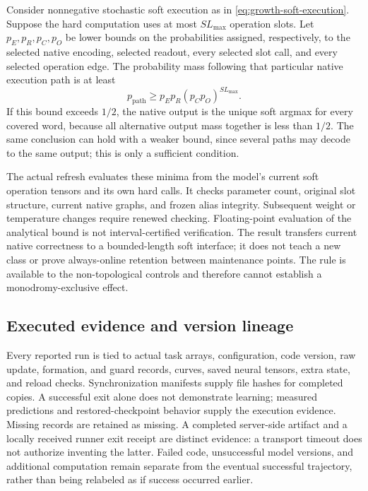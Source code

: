Consider nonnegative stochastic soft execution as in
\eqref{eq:growth-soft-execution}. Suppose the hard computation uses at most
$S L_{\max}$ operation slots. Let $p_E,p_R,p_C,p_O$ be lower bounds on the
probabilities assigned, respectively, to the selected native encoding,
selected readout, every selected slot call, and every selected operation edge.
The probability mass following that particular native execution path is at
least
\begin{equation}
 p_{\mathrm{path}}\geq p_Ep_R(p_Cp_O)^{S L_{\max}}.
 \label{eq:soft-native-path-bound}
\end{equation}
If this bound exceeds $1/2$, the native output is the unique soft argmax for
every covered word, because all alternative output mass together is less than
$1/2$. The same conclusion can hold with a weaker bound, since several paths
may decode to the same output; this is only a sufficient condition.

The actual refresh evaluates these minima from the model's current soft
operation tensors and its own hard calls. It checks parameter count, original
slot structure, current native graphs, and frozen alias integrity. Subsequent
weight or temperature changes require renewed checking. Floating-point
evaluation of the analytical bound is not interval-certified verification.
The result transfers current native correctness to a bounded-length soft
interface; it does not teach a new class or prove always-online retention
between maintenance points. The rule is available to the non-topological
controls and therefore cannot establish a monodromy-exclusive effect.

\subsection{Executed evidence and version lineage}

Every reported run is tied to actual task arrays, configuration, code version,
raw update, formation, and guard records, curves, saved neural tensors, extra state,
and reload checks. Synchronization manifests supply file hashes for completed
copies. A successful exit alone does not demonstrate learning; measured
predictions and restored-checkpoint behavior supply the execution evidence.
Missing records are retained as missing. A completed server-side artifact and
a locally received runner exit receipt are distinct evidence: a transport
timeout does not authorize inventing the latter. Failed code, unsuccessful model
versions, and additional computation remain separate from the eventual
successful trajectory, rather than being relabeled as if success occurred
earlier.

